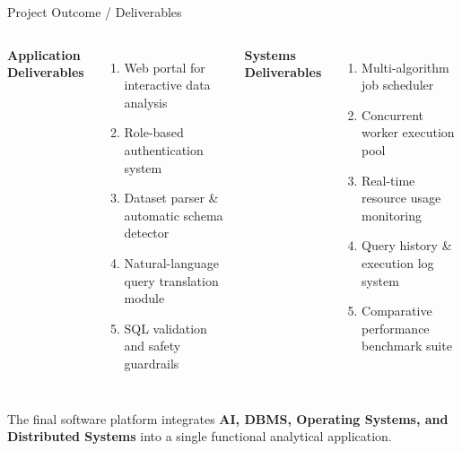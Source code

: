 \documentclass[aspectratio=169,11pt]{beamer}
\begin{document}
\begin{frame}{Project Outcome / Deliverables}

\begin{columns}[T,totalwidth=\textwidth]

\textbf{\color{GEUBlue}\small Application Deliverables}
\begin{enumerate}\itemsep1.5pt
\scriptsize
\item Web portal for interactive data analysis
\item Role-based authentication system
\item Dataset parser \& automatic schema detector
\item Natural-language query translation module
\item SQL validation and safety guardrails
\end{enumerate}

\textbf{\color{GEUBlue}\small Systems Deliverables}
\begin{enumerate}\itemsep1.5pt
\scriptsize
\item Multi-algorithm job scheduler
\item Concurrent worker execution pool
\item Real-time resource usage monitoring
\item Query history \& execution log system
\item Comparative performance benchmark suite
\end{enumerate}

\end{columns}

\vspace{3mm}

\begin{center}
\colorbox{GEULightBlue}{
\parbox{.88\textwidth}{
\centering\scriptsize
The final software platform integrates \textbf{AI, DBMS, Operating Systems, and Distributed Systems} into a single functional analytical application.
}}
\end{center}

\end{frame}


\end{document}
